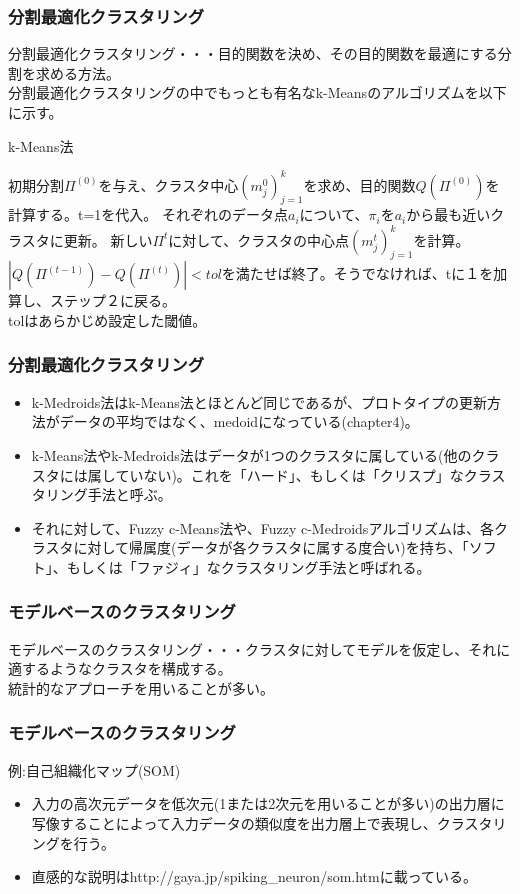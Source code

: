 \documentclass[dvipdfmx,11pt,notheorems]{beamer}
\theoremstyle{definition}
\begin{document}
\begin{frame}\frametitle{分割最適化クラスタリング}
分割最適化クラスタリング・・・目的関数を決め、その目的関数を最適にする分割を求める方法。\\
分割最適化クラスタリングの中でもっとも有名なk-Meansのアルゴリズムを以下に示す。\\
\begin{algorithm}[H]
\caption{k-Means法}
\begin{algorithmic}[1]
\STATE 初期分割$\Pi^{(0)}$を与え、クラスタ中心$(m_j^{0})_{j=1}^{k}$を求め、目的関数$Q(\Pi^{(0)})$を計算する。t=1を代入。
\STATE それぞれのデータ点$a_i$について、$\pi_i$を$a_i$から最も近いクラスタに更新。
\STATE 新しい$\Pi^{t}$に対して、クラスタの中心点$(m_j^{t})_{j=1}^{k}$を計算。
\STATE $|Q(\Pi^{(t-1)})-Q(\Pi^{(t)})| < tol$を満たせば終了。そうでなければ、tに１を加算し、ステップ２に戻る。\\
tolはあらかじめ設定した閾値。
\end{algorithmic}
\end{algorithm}
\end{frame}


\begin{frame}\frametitle{分割最適化クラスタリング}
\begin{itemize}
\item k-Medroids法はk-Means法とほとんど同じであるが、プロトタイプの更新方法がデータの平均ではなく、medoidになっている(chapter4)。
\item k-Means法やk-Medroids法はデータが1つのクラスタに属している(他のクラスタには属していない)。これを「ハード」、もしくは「クリスプ」なクラスタリング手法と呼ぶ。
\item それに対して、Fuzzy c-Means法や、Fuzzy c-Medroidsアルゴリズムは、各クラスタに対して帰属度(データが各クラスタに属する度合い)を持ち、「ソフト」、もしくは「ファジィ」なクラスタリング手法と呼ばれる。
\end{itemize}
\end{frame}


\begin{frame}\frametitle{モデルベースのクラスタリング}
モデルベースのクラスタリング・・・クラスタに対してモデルを仮定し、それに適するようなクラスタを構成する。\\
統計的なアプローチを用いることが多い。
\end{frame}

\begin{frame}\frametitle{モデルベースのクラスタリング}
例:自己組織化マップ(SOM)
\begin{itemize}
\item 入力の高次元データを低次元(1または2次元を用いることが多い)の出力層に写像することによって入力データの類似度を出力層上で表現し、クラスタリングを行う。
\item 直感的な説明はhttp://gaya.jp/spiking\_neuron/som.htmに載っている。
\end{itemize}

\end{frame}
\end{document}
